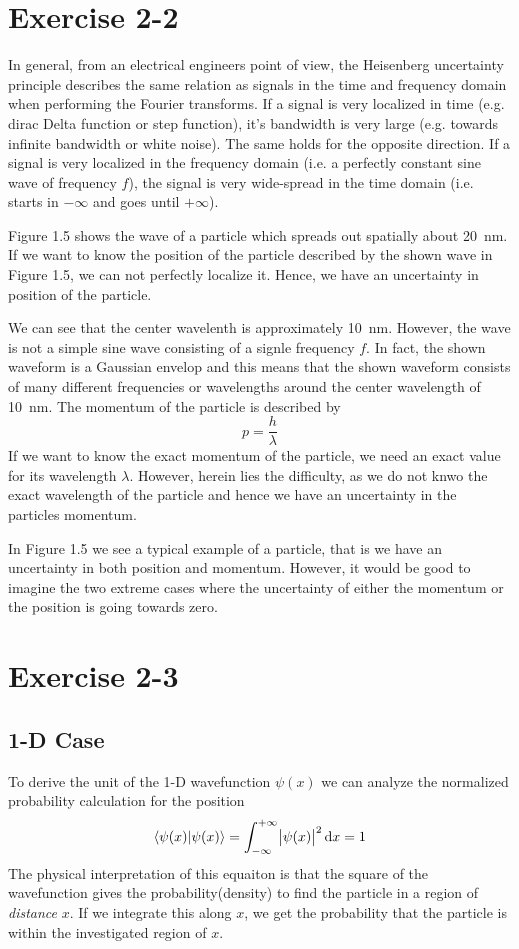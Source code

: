 \newpage
\section{Exercise 2-2}
In general, from an electrical engineers point of view, the Heisenberg
uncertainty principle describes the same relation as signals in the time and
frequency domain when performing the Fourier transforms. If a signal is very
localized in time (e.g. dirac Delta function or step function), it's
bandwidth is very large (e.g. towards infinite bandwidth or white noise).
The same holds for the opposite direction. If a signal is very localized in
the frequency domain (i.e. a perfectly constant sine wave of frequency $f$),
the signal is very wide-spread in the time domain (i.e. starts in
$-\infty$ and goes until $+\infty$).

Figure 1.5 shows the wave of a particle which spreads out spatially about
\SI{20}{\nano\meter}. If we want to know the position of the particle
described by the shown wave in Figure 1.5, we can not perfectly localize
it. Hence, we have an uncertainty in position of the particle.

We can see that the center wavelenth is approximately \SI{10}{\nano\meter}.
However, the wave is not a simple sine wave consisting of a signle frequency
$f$. In fact, the shown waveform is a Gaussian envelop and this means that
the shown waveform consists of many different frequencies or wavelengths
around the center wavelength of \SI{10}{\nano\meter}. The momentum of the
particle is described by
\[
	p = \frac{h}{\lambda}
\]
If we want to know the exact momentum of the particle, we need an exact
value for its wavelength $\lambda$. However, herein lies the difficulty,
as we do not knwo the exact wavelength of the particle and hence we
have an uncertainty in the particles momentum.

In Figure 1.5 we see a typical example of a particle, that is we have an
uncertainty in both position and momentum. However, it would be good to
imagine the two extreme cases where the uncertainty of either the momentum
or the position is going towards zero.

\newpage
\section{Exercise 2-3}

\subsection{1-D Case}
To derive the unit of the 1-D wavefunction $\psi(x)$ we can analyze the
normalized probability calculation for the position
\[
	\braket{\psi(x)|\psi(x)}
	= \int_{-\infty}^{+\infty}{\abs{\psi(x)}^2} \dif x
	= 1
\]
The physical interpretation of this equaiton is that the square of the 
wavefunction gives the probability(density) to find the particle in a
region of \emph{distance} $x$. If we integrate this along $x$, we get
the probability that the particle is within the investigated region of $x$.

